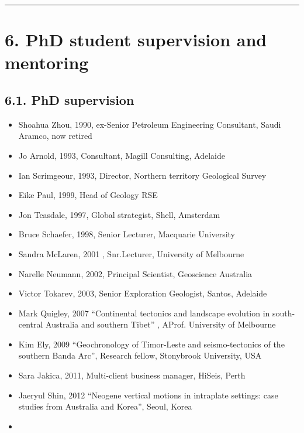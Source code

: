 \documentclass[
]{article}
\providecommand{\tightlist}{%
  \setlength{\itemsep}{0pt}\setlength{\parskip}{0pt}}
\begin{document}
\begin{center}\rule{0.5\linewidth}{0.5pt}\end{center}

\hypertarget{phd-student-supervision-and-mentoring}{%
\section{6. PhD student supervision and
mentoring}\label{phd-student-supervision-and-mentoring}}

\hypertarget{phd-supervision}{%
\subsection{6.1. PhD supervision}\label{phd-supervision}}

\begin{itemize}
\tightlist
\item
  Shoahua Zhou, 1990, ex-Senior Petroleum Engineering Consultant, Saudi
  Aramco, now retired
\item
  Jo Arnold, 1993, Consultant, Magill Consulting, Adelaide
\item
  Ian Scrimgeour, 1993, Director, Northern territory Geological Survey
\item
  Eike Paul, 1999, Head of Geology RSE
\item
  Jon Teasdale, 1997, Global strategist, Shell, Amsterdam
\item
  Bruce Schaefer, 1998, Senior Lecturer, Macquarie University
\item
  Sandra McLaren, 2001 , Snr.Lecturer, University of Melbourne
\item
  Narelle Neumann, 2002, Principal Scientist, Geoscience Australia
\item
  Victor Tokarev, 2003, Senior Exploration Geologist, Santos, Adelaide
\item
  Mark Quigley, 2007 ``Continental tectonics and landscape evolution in
  south-central Australia and southern Tibet'' , AProf. University of
  Melbourne
\item
  Kim Ely, 2009 ``Geochronology of Timor-Leste and seismo-tectonics of
  the southern Banda Arc'', Research fellow, Stonybrook University, USA
\item
  Sara Jakica, 2011, Multi-client business manager, HiSeis, Perth
\item
  Jaeryul Shin, 2012 ``Neogene vertical motions in intraplate settings:
  case studies from Australia and Korea'', Seoul, Korea
\item

\end{itemize}
\end{document}
